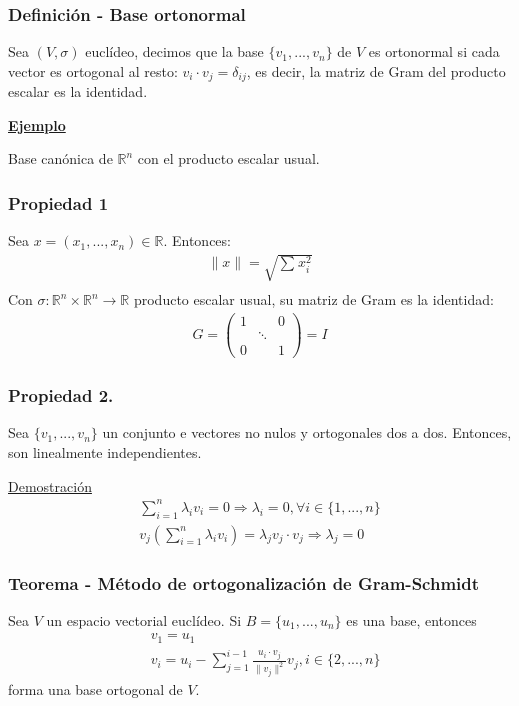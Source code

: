 \documentclass[12pt, a4paper, ones, notitlepage, openany,titlepage]{article}
\newcommand{\demostracion}{\noindent\underline{Demostración}}
\newcommand{\ejemplo}{\noindent\underline{\textbf{Ejemplo}}}
\begin{document}
\subsubsection{Definición - Base ortonormal} Sea $(V,\sigma)$ euclídeo, decimos que la base $\{v_{1},...,v_{n}\}$ de $V$ es ortonormal si cada vector es ortogonal al resto: $v_{i} \cdot v_{j} = \delta_{ij}$, es decir, la matriz de Gram del producto escalar es la identidad.

\ejemplo

Base canónica de $\mathbb{R}^{n}$ con el producto escalar usual.

\subsubsection{Propiedad 1}
Sea $x = (x_1,...,x_n) \in \mathbb{R}$. Entonces:
\begin{align*}
	\|x\| = \sqrt{\sum_{}^{}x_i^2}\\
\end{align*}
Con $\sigma: \mathbb{R}^n \times \mathbb{R}^n \longrightarrow \mathbb{R}$ producto escalar usual, su matriz de Gram es la identidad:
\begin{align*}
	G = \left(
	\begin{matrix}
		1 &        & 0 \\
		& \ddots &   \\
		0 &        & 1
	\end{matrix}
	\right) = I
\end{align*}

\subsubsection{Propiedad 2.}
Sea $\{v_1,...,v_n\}$ un conjunto e vectores no nulos y ortogonales dos a dos. Entonces, son linealmente independientes.

\demostracion
\begin{align*}
	\sum_{i=1}^{n} \lambda_i v_i = 0 \Longrightarrow \lambda_i = 0, \forall i \in \{1,...,n\}\\
	v_j \left( \sum_{i=1}^{n} \lambda_i v_i \right) = \lambda_j v_j \cdot v_j \Longrightarrow \lambda_j = 0
\end{align*}

\subsubsection{Teorema - Método de ortogonalización de Gram-Schmidt}
\noindent Sea $V$ un espacio vectorial euclídeo. Si $B = \{u_1,...,u_n\}$ es una base, entonces
\begin{align*}
	&v_1 = u_1 \\
	&v_i = u_i - \sum_{j=1}^{i-1} \frac{u_i \cdot v_j}{\|v_j\|^2} v_j, i \in \{2,...,n\}
\end{align*}
forma una base ortogonal de $V$.
\end{document}
